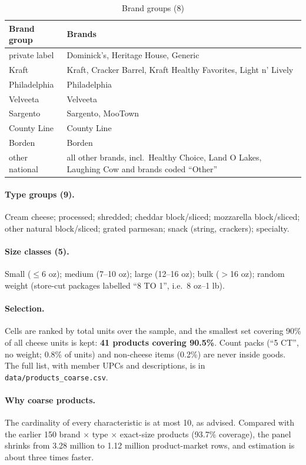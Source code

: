 \documentclass[11pt]{article}
\newcommand{\code}[1]{\texttt{#1}}
\begin{document}
\begin{table}[htbp]
\centering
\small
\caption{Brand groups (8)}\label{tab:brands}
\begin{tabularx}{0.85\textwidth}{@{}lL@{}}
\toprule
Brand group & Brands \\
\midrule
private label & Dominick's, Heritage House, Generic \\
Kraft & Kraft, Cracker Barrel, Kraft Healthy Favorites, Light n' Lively \\
Philadelphia & Philadelphia \\
Velveeta & Velveeta \\
Sargento & Sargento, MooTown \\
County Line & County Line \\
Borden & Borden \\
other national & all other brands, incl.\ Healthy Choice, Land O Lakes, Laughing Cow and
                 brands coded ``Other'' \\
\bottomrule
\end{tabularx}
\end{table}

\paragraph{Type groups (9).} Cream cheese; processed; shredded; cheddar block/sliced;
mozzarella block/sliced; other natural block/sliced; grated parmesan; snack (string, crackers);
specialty.

\paragraph{Size classes (5).} Small ($\le$6 oz); medium (7--10 oz); large (12--16 oz); bulk
($>$16 oz); random weight (store-cut packages labelled ``8 TO 1'', i.e.\ 8 oz--1 lb).

\paragraph{Selection.} Cells are ranked by total units over the sample, and the smallest set
covering 90\% of all cheese units is kept: \textbf{41 products covering 90.5\%}. Count packs
(``5 CT'', no weight; 0.8\% of units) and non-cheese items (0.2\%) are never inside goods. The
full list, with member UPCs and descriptions, is in \code{data/products\_coarse.csv}.

\paragraph{Why coarse products.} The cardinality of every characteristic is at most 10, as
advised. Compared with the earlier 150 brand $\times$ type $\times$ exact-size products (93.7\%
coverage), the panel shrinks from 3.28 million to 1.12 million product-market rows, and
estimation is about three times faster.
\end{document}
